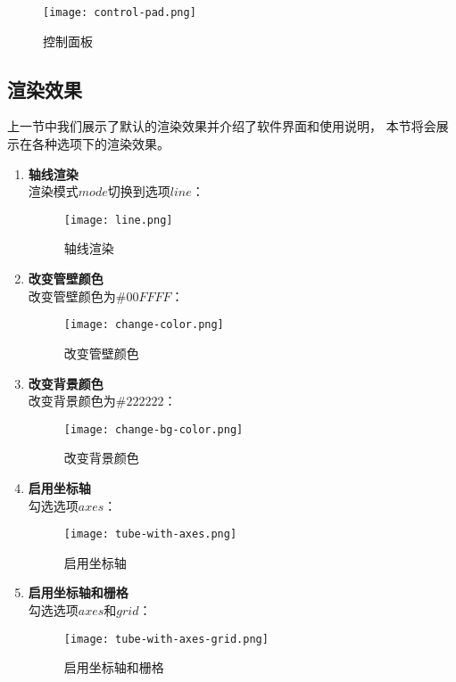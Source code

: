 \begin{figure}[H]
\centering
\texttt{[image: control-pad.png]}
\caption{控制面板}
\label{fig:control-pad}
\end{figure}

\subsection{渲染效果}
上一节中我们展示了默认的渲染效果并介绍了软件界面和使用说明，
本节将会展示在各种选项下的渲染效果。

\begin{enumerate}

\item \textbf{轴线渲染} \\
渲染模式$mode$切换到选项$line$：

\begin{figure}[H]
\centering
\texttt{[image: line.png]}
\caption{轴线渲染}
\label{fig:line}
\end{figure}

\item \textbf{改变管壁颜色} \\
改变管壁颜色为$\#00FFFF$：

\begin{figure}[H]
\centering
\texttt{[image: change-color.png]}
\caption{改变管壁颜色}
\label{fig:change-color}
\end{figure}

\item \textbf{改变背景颜色} \\
改变背景颜色为$\#222222$：

\begin{figure}[H]
\centering
\texttt{[image: change-bg-color.png]}
\caption{改变背景颜色}
\label{fig:change-bg-color}
\end{figure}

\item \textbf{启用坐标轴} \\
勾选选项$axes$：

\begin{figure}[H]
\centering
\texttt{[image: tube-with-axes.png]}
\caption{启用坐标轴}
\label{fig:tube-with-axes}
\end{figure}

\item \textbf{启用坐标轴和栅格} \\
勾选选项$axes$和$grid$：

\begin{figure}[H]
\centering
\texttt{[image: tube-with-axes-grid.png]}
\caption{启用坐标轴和栅格}
\label{fig:tube-with-axes-grid}
\end{figure}

\end{enumerate}

